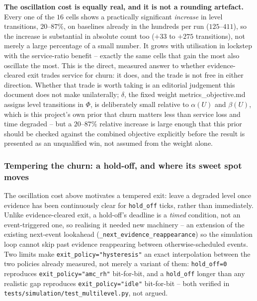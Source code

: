\textbf{The oscillation cost is equally real, and it is not a rounding
artefact.} Every one of the $16$ cells shows a practically significant
\emph{increase} in level transitions, $20$--$87\%$, on baselines already in the
hundreds per run ($125$--$411$), so the increase is substantial in absolute
count too ($+33$ to $+275$ transitions), not merely a large percentage of a
small number. It grows with utilisation in lockstep with the service-ratio
benefit -- exactly the same cells that gain the most also oscillate the most.
This is the direct, measured answer to whether evidence-cleared exit trades
service for churn: it does, and the trade is not free in either direction.
Whether that trade is worth taking is an editorial judgement this document
does not make unilaterally; $\delta$, the fixed weight metrics\_objective.md
assigns level transitions in $\Phi$, is deliberately small relative to
$\alpha(U)$ and $\beta(U)$, which is this project's own prior that churn
matters less than service loss and time degraded -- but a $20$--$87\%$ relative
increase is large enough that this prior should be checked against the
combined objective explicitly before the result is presented as an
unqualified win, not assumed from the weight alone.

\subsubsection{Tempering the churn: a hold-off, and where its sweet spot moves}
\label{sec:tempered-exit}

The oscillation cost above motivates a tempered exit: leave a degraded level
once evidence has been continuously clear for \texttt{hold\_off} ticks, rather
than immediately. Unlike evidence-cleared exit, a hold-off's deadline is a
\emph{timed} condition, not an event-triggered one, so realising it needed new
machinery -- an extension of the existing next-event lookahead
(\texttt{\_next\_evidence\_reappearance}) so the simulation loop cannot skip
past evidence reappearing between otherwise-scheduled events. Two limits make
\texttt{exit\_policy="hysteresis"} an exact interpolation between the two
policies already measured, not merely a variant of them:
\texttt{hold\_off=0} reproduces \texttt{exit\_policy="amc\_rh"} bit-for-bit,
and a \texttt{hold\_off} longer than any realistic gap reproduces
\texttt{exit\_policy="idle"} bit-for-bit -- both verified in
\texttt{tests/simulation/test\_multilevel.py}, not argued.

